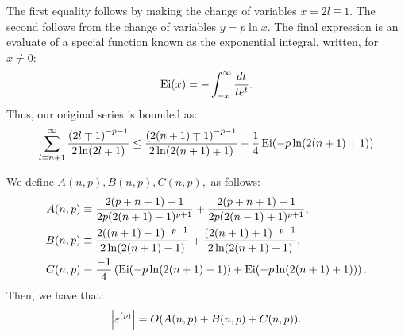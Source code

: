 The first equality follows by making the change of variables
$x = 2l \mp 1$. The second follows from the change of variables
$y = p \ln x$. The final expression is an evaluate of a special
function known as the exponential integral, written, for $x \neq 0$:
\begin{align*}
  \operatorname{Ei}(x) = - \int_{-x}^\infty \frac{dt}{te^t}.
\end{align*}
Thus, our original series is bounded as:
\begin{align*}
  \sum_{l=n+1}^\infty \frac{{(2l \mp 1)}^{-p-1}}{2\ln(2l \mp 1)} \leq \frac{{(2(n+1) \mp 1)}^{-p-1}}{2 \ln(2(n+1) \mp 1)} - \frac{1}{4} \operatorname{Ei}(-p \ln (2(n+1) \mp 1))
\end{align*}

We define $A(n, p), B(n, p), C(n, p),$ as follows:
\begin{align}
  A(n, p) &\equiv \frac{2(p + n + 1) - 1}{2p(2(n+1) - 1)^{p+1}} + \frac{2(p+n+1) + 1}{2p(2(n-1)+1)^{p+1}}, \\
  B(n, p) &\equiv \frac{2((n+1) - 1)^{-p-1}}{2 \ln (2(n+1) - 1)} + \frac{(2(n+1) + 1)^{-p-1}}{2 \ln (2(n+1) + 1)}, \\
  C(n, p) &\equiv \frac{-1}{4} \left(\operatorname{Ei}(-p \ln(2(n+1)-1)) + \operatorname{Ei}(-p \ln(2(n+1) + 1))\right).
\end{align}
Then, we have that:
\begin{align}
  \left|\varepsilon^{(p)}\right| = O(A(n,p) + B(n,p) + C(n,p)).
\end{align}

